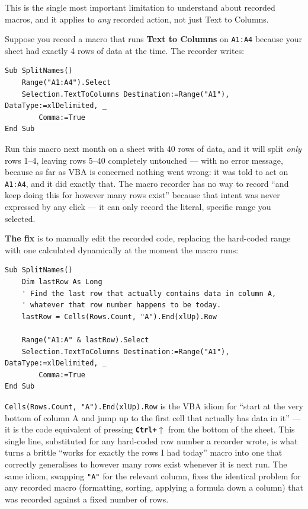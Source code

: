 \documentclass[11pt,a4paper]{article}
\newcommand{\key}[1]{\texttt{\colorbox{black!8}{\textbf{#1}}}}
\begin{document}
This is the single most important limitation to understand about recorded macros, and it applies to \emph{any} recorded action, not just Text to Columns.

\begin{pitfall}
Suppose you record a macro that runs \textbf{Text to Columns} on \texttt{A1:A4} because your sheet had exactly 4 rows of data at the time. The recorder writes:
\begin{lstlisting}[style=vbastyle, caption={Recorded Text to Columns -- hard-coded to exactly 4 rows}]
Sub SplitNames()
    Range("A1:A4").Select
    Selection.TextToColumns Destination:=Range("A1"), DataType:=xlDelimited, _
        Comma:=True
End Sub
\end{lstlisting}
Run this macro next month on a sheet with 40 rows of data, and it will split \emph{only} rows 1--4, leaving rows 5--40 completely untouched --- with no error message, because as far as VBA is concerned nothing went wrong: it was told to act on \texttt{A1:A4}, and it did exactly that. The macro recorder has no way to record ``and keep doing this for however many rows exist'' because that intent was never expressed by any click --- it can only record the literal, specific range you selected.
\end{pitfall}

\textbf{The fix} is to manually edit the recorded code, replacing the hard-coded range with one calculated dynamically at the moment the macro runs:

\begin{lstlisting}[style=vbastyle, caption={Fixed version: dynamically finds the last used row instead of assuming 4}]
Sub SplitNames()
    Dim lastRow As Long
    ' Find the last row that actually contains data in column A,
    ' whatever that row number happens to be today.
    lastRow = Cells(Rows.Count, "A").End(xlUp).Row

    Range("A1:A" & lastRow).Select
    Selection.TextToColumns Destination:=Range("A1"), DataType:=xlDelimited, _
        Comma:=True
End Sub
\end{lstlisting}

\begin{keyconcept}
\texttt{Cells(Rows.Count, "A").End(xlUp).Row} is the VBA idiom for ``start at the very bottom of column A and jump up to the first cell that actually has data in it'' --- it is the code equivalent of pressing \key{Ctrl+$\uparrow$} from the bottom of the sheet. This single line, substituted for any hard-coded row number a recorder wrote, is what turns a brittle ``works for exactly the rows I had today'' macro into one that correctly generalises to however many rows exist whenever it is next run. The same idiom, swapping \texttt{"A"} for the relevant column, fixes the identical problem for any recorded macro (formatting, sorting, applying a formula down a column) that was recorded against a fixed number of rows.
\end{keyconcept}
\end{document}
